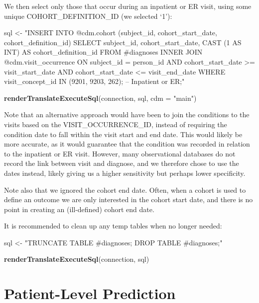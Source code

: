 \documentclass[11pt]{book}
\newenvironment{Shaded}{\begin{snugshade}}{\end{snugshade}}
\newcommand{\DataTypeTok}[1]{\textcolor[rgb]{0.13,0.29,0.53}{#1}}
\newcommand{\KeywordTok}[1]{\textcolor[rgb]{0.13,0.29,0.53}{\textbf{#1}}}
\newcommand{\NormalTok}[1]{#1}
\newcommand{\StringTok}[1]{\textcolor[rgb]{0.31,0.60,0.02}{#1}}
\theoremstyle{definition}
\theoremstyle{definition}
\theoremstyle{definition}
\theoremstyle{remark}
\begin{document}
We then select only those that occur during an inpatient or ER visit, using some unique COHORT\_DEFINITION\_ID (we selected `1'):

\begin{Shaded}
\begin{Highlighting}[]
\NormalTok{sql <-}\StringTok{ "INSERT INTO @cdm.cohort (subject_id, cohort_start_date, cohort_definition_id)}
\StringTok{SELECT subject_id,}
\StringTok{  cohort_start_date,}
\StringTok{  CAST (1 AS INT) AS cohort_definition_id}
\StringTok{FROM #diagnoses}
\StringTok{INNER JOIN @cdm.visit_occurrence}
\StringTok{  ON subject_id = person_id}
\StringTok{    AND cohort_start_date >= visit_start_date}
\StringTok{    AND cohort_start_date <= visit_end_date}
\StringTok{WHERE visit_concept_id IN (9201, 9203, 262); -- Inpatient or ER;"}

\KeywordTok{renderTranslateExecuteSql}\NormalTok{(connection, sql, }\DataTypeTok{cdm =} \StringTok{"main"}\NormalTok{)}
\end{Highlighting}
\end{Shaded}

Note that an alternative approach would have been to join the conditions to the visits based on the VISIT\_OCCURRENCE\_ID, instead of requiring the condition date to fall within the visit start and end date. This would likely be more accurate, as it would guarantee that the condition was recorded in relation to the inpatient or ER visit. However, many observational databases do not record the link between visit and diagnose, and we therefore chose to use the dates instead, likely giving us a higher sensitivity but perhaps lower specificity.

Note also that we ignored the cohort end date. Often, when a cohort is used to define an outcome we are only interested in the cohort start date, and there is no point in creating an (ill-defined) cohort end date.

It is recommended to clean up any temp tables when no longer needed:

\begin{Shaded}
\begin{Highlighting}[]
\NormalTok{sql <-}\StringTok{ "TRUNCATE TABLE #diagnoses;}
\StringTok{DROP TABLE #diagnoses;"}

\KeywordTok{renderTranslateExecuteSql}\NormalTok{(connection, sql)}
\end{Highlighting}
\end{Shaded}

\hypertarget{Plpanswers}{%
\section{Patient-Level Prediction}\label{Plpanswers}}
\end{document}
